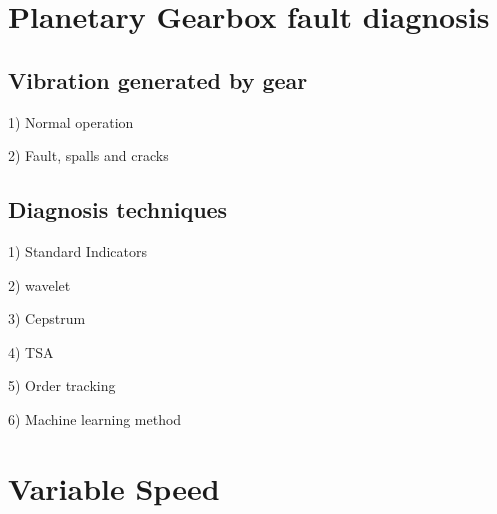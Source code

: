 \section{Planetary Gearbox fault diagnosis}



\subsection{Vibration generated by gear}

1)	Normal operation

2)	Fault, spalls and cracks

\subsection{Diagnosis techniques}

1)	Standard Indicators

2)	wavelet

3)	Cepstrum

4)	TSA

5)	Order tracking

6)	Machine learning method


\section{Variable Speed}
